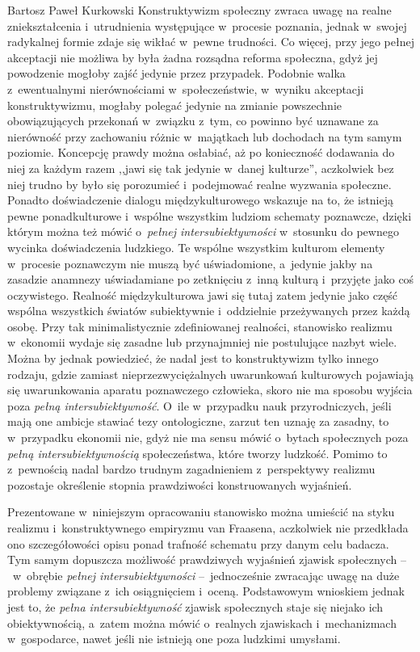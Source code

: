 \begin{artplenv}{Bartosz Paweł Kurkowski}
Konstruktywizm społeczny zwraca uwagę na realne zniekształcenia i~utrudnienia występujące w~procesie poznania,
jednak w~swojej radykalnej formie zdaje się wikłać w~pewne trudności. Co więcej, przy jego pełnej akceptacji nie możliwa by była
żadna rozsądna reforma społeczna, gdyż jej powodzenie mogłoby zajść jedynie przez przypadek. Podobnie
walka z~ewentualnymi nierównościami w~społeczeństwie, w~wyniku akceptacji konstruktywizmu, mogłaby polegać jedynie na zmianie
powszechnie obowiązujących przekonań w~związku z~tym, co powinno być uznawane za nierówność przy zachowaniu
różnic w~majątkach lub dochodach na tym samym poziomie.  Koncepcję prawdy można osłabiać, aż po konieczność dodawania do niej za
każdym razem ,,jawi się tak jedynie w~danej kulturze'', aczkolwiek bez niej trudno by było się porozumieć i~podejmować
realne wyzwania społeczne. Ponadto doświadczenie dialogu międzykulturowego wskazuje na to, że istnieją pewne
ponadkulturowe i~wspólne wszystkim ludziom schematy poznawcze, dzięki którym można też mówić o~\textit{pełnej
intersubiektywności} w~stosunku do pewnego wycinka doświadczenia ludzkiego. Te wspólne wszystkim kulturom
elementy w~procesie poznawczym nie muszą być uświadomione, a~jedynie jakby na zasadzie anamnezy uświadamiane po zetknięciu z~inną
kulturą i~przyjęte jako coś oczywistego. Realność międzykulturowa jawi się tutaj zatem jedynie jako część wspólna
wszystkich światów subiektywnie i~oddzielnie przeżywanych przez każdą osobę. Przy tak minimalistycznie zdefiniowanej
realności, stanowisko realizmu w~ekonomii wydaje się zasadne lub przynajmniej nie postulujące nazbyt wiele. Można by
jednak powiedzieć, że nadal jest to konstruktywizm tylko innego rodzaju, gdzie zamiast nieprzezwyciężalnych uwarunkowań
kulturowych pojawiają się uwarunkowania aparatu poznawczego człowieka, skoro nie ma sposobu wyjścia poza \textit{pełną
intersubiektywność}. O~ile w~przypadku nauk przyrodniczych, jeśli mają one ambicje stawiać tezy ontologiczne, zarzut
ten uznaję za zasadny, to w~przypadku ekonomii nie, gdyż nie ma sensu mówić o~bytach społecznych poza \textit{pełną
intersubiektywnością} społeczeństwa, które tworzy ludzkość. Pomimo to z~pewnością nadal bardzo trudnym
zagadnieniem z~perspektywy realizmu pozostaje określenie stopnia prawdziwości konstruowanych wyjaśnień.


Prezentowane w~niniejszym opracowaniu stanowisko można umieścić na styku realizmu i~konstruktywnego empiryzmu van
Fraasena, aczkolwiek nie przedkłada ono szczegółowości opisu ponad trafność schematu przy danym celu badacza. Tym samym
dopuszcza możliwość prawdziwych wyjaśnień zjawisk społecznych --~w~obrębie
\textit{pełnej intersubiektywności} --~jednocześnie zwracając uwagę na duże problemy
związane z~ich osiągnięciem i~oceną. Podstawowym wnioskiem jednak jest
to, że \textit{pełna intersubiektywność }zjawisk społecznych staje się niejako ich obiektywnością, a~zatem można mówić
o~realnych zjawiskach i~mechanizmach w~gospodarce, nawet jeśli nie istnieją one poza ludzkimi umysłami.


\end{artplenv}
